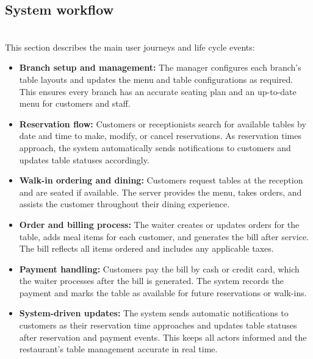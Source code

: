 \subsection{System workflow}\label{JVfdWAil_fvAYNgBdnLZD}
\\
This section describes the main user journeys and life cycle events:

\begin{itemize}
\item
\protect{}\label{WxN8iiDr-v3aGOKnb_67X}
\textbf{Branch setup and management:} The manager configures each branch's table layouts and updates the menu and table configurations as required. This ensures every branch has an accurate seating plan and an up-to-date menu for customers and staff.
\item
\protect{}\label{-xWh-VGdEsSm3Ghte-tRp}
\textbf{Reservation flow:} Customers or receptionists search for available tables by date and time to make, modify, or cancel reservations. As reservation times approach, the system automatically sends notifications to customers and updates table statuses accordingly.
\item
\protect{}\label{RicH1Y69t3jAxaAEhoeAf}
\textbf{Walk-in ordering and dining:} Customers request tables at the reception and are seated if available. The server provides the menu, takes orders, and assists the customer throughout their dining experience.
\item
\protect{}\label{wgrEGLyqe9bfFmAR21fNw}
\textbf{Order and billing process:} The waiter creates or updates orders for the table, adds meal items for each customer, and generates the bill after service. The bill reflects all items ordered and includes any applicable taxes.
\item
\protect{}\label{IKyEfLqlCIiv5252NaQT3}
\textbf{Payment handling:} Customers pay the bill by cash or credit card, which the waiter processes after the bill is generated. The system records the payment and marks the table as available for future reservations or walk-ins.
\item
\protect{}\label{1D43D4BL30SKp96T-Hpg3}
\textbf{System-driven updates:} The system sends automatic notifications to customers as their reservation time approaches and updates table statuses after reservation and payment events. This keeps all actors informed and the restaurant's table management accurate in real time.
\end{itemize}


